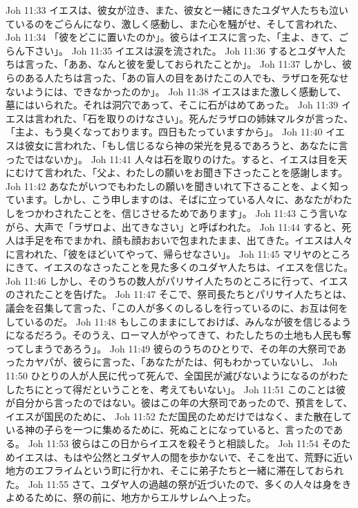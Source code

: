 Joh 11:33  イエスは、彼女が泣き、また、彼女と一緒にきたユダヤ人たちも泣いているのをごらんになり、激しく感動し、また心を騒がせ、そして言われた、
Joh 11:34  「彼をどこに置いたのか」。彼らはイエスに言った、「主よ、きて、ごらん下さい」。
Joh 11:35  イエスは涙を流された。
Joh 11:36  するとユダヤ人たちは言った、「ああ、なんと彼を愛しておられたことか」。
Joh 11:37  しかし、彼らのある人たちは言った、「あの盲人の目をあけたこの人でも、ラザロを死なせないようには、できなかったのか」。
Joh 11:38  イエスはまた激しく感動して、墓にはいられた。それは洞穴であって、そこに石がはめてあった。
Joh 11:39  イエスは言われた、「石を取りのけなさい」。死んだラザロの姉妹マルタが言った、「主よ、もう臭くなっております。四日もたっていますから」。
Joh 11:40  イエスは彼女に言われた、「もし信じるなら神の栄光を見るであろうと、あなたに言ったではないか」。
Joh 11:41  人々は石を取りのけた。すると、イエスは目を天にむけて言われた、「父よ、わたしの願いをお聞き下さったことを感謝します。
Joh 11:42  あなたがいつでもわたしの願いを聞きいれて下さることを、よく知っています。しかし、こう申しますのは、そばに立っている人々に、あなたがわたしをつかわされたことを、信じさせるためであります」。
Joh 11:43  こう言いながら、大声で「ラザロよ、出てきなさい」と呼ばわれた。
Joh 11:44  すると、死人は手足を布でまかれ、顔も顔おおいで包まれたまま、出てきた。イエスは人々に言われた、「彼をほどいてやって、帰らせなさい」。
Joh 11:45  マリヤのところにきて、イエスのなさったことを見た多くのユダヤ人たちは、イエスを信じた。
Joh 11:46  しかし、そのうちの数人がパリサイ人たちのところに行って、イエスのされたことを告げた。
Joh 11:47  そこで、祭司長たちとパリサイ人たちとは、議会を召集して言った、「この人が多くのしるしを行っているのに、お互は何をしているのだ。
Joh 11:48  もしこのままにしておけば、みんなが彼を信じるようになるだろう。そのうえ、ローマ人がやってきて、わたしたちの土地も人民も奪ってしまうであろう」。
Joh 11:49  彼らのうちのひとりで、その年の大祭司であったカヤパが、彼らに言った、「あなたがたは、何もわかっていないし、
Joh 11:50  ひとりの人が人民に代って死んで、全国民が滅びないようになるのがわたしたちにとって得だということを、考えてもいない」。
Joh 11:51  このことは彼が自分から言ったのではない。彼はこの年の大祭司であったので、預言をして、イエスが国民のために、
Joh 11:52  ただ国民のためだけではなく、また散在している神の子らを一つに集めるために、死ぬことになっていると、言ったのである。
Joh 11:53  彼らはこの日からイエスを殺そうと相談した。
Joh 11:54  そのためイエスは、もはや公然とユダヤ人の間を歩かないで、そこを出て、荒野に近い地方のエフライムという町に行かれ、そこに弟子たちと一緒に滞在しておられた。
Joh 11:55  さて、ユダヤ人の過越の祭が近づいたので、多くの人々は身をきよめるために、祭の前に、地方からエルサレムへ上った。
